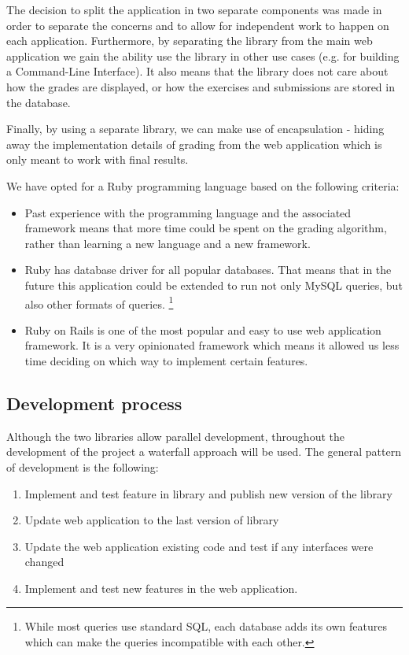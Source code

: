 The decision to split the application in two separate components was made in order to separate the concerns and to allow for independent work to happen on each application. Furthermore, by separating the library from the main web application we gain the ability use the library in other use cases (e.g. for building a Command-Line Interface). It also means that the library does not care about how the grades are displayed, or how the exercises and submissions are stored in the database.

Finally, by using a separate library, we can make use of encapsulation - hiding away the implementation details of grading from the web application which is only meant to work with final results.

We have opted for a Ruby programming language based on the following criteria:

\begin{itemize}
    \item Past experience with the programming language and the associated framework means that more time could be spent on the grading algorithm, rather than learning a new language and a new framework.
    \item Ruby has database driver for all popular databases. That means that in the future this application could be extended to run not only MySQL queries, but also other formats of queries. \footnote{While most queries use standard SQL, each database adds its own features which can make the queries incompatible with each other.}
    \item Ruby on Rails is one of the most popular and easy to use web application framework. It is a very opinionated framework which means it allowed us less time deciding on which way to implement certain features.
\end{itemize}

\subsection{Development process} \label{ch:reqandspec:sec:spec:subsec:dev_process}

Although the two libraries allow parallel development, throughout the development of the project a waterfall approach will be used. The general pattern of development is the following:

\begin{enumerate}
  \item Implement and test feature in library and publish new version of the library
  \item Update web application to the last version of library
  \item Update the web application existing code and test if any interfaces were changed
  \item Implement and test new features in the web application.
\end{enumerate}

